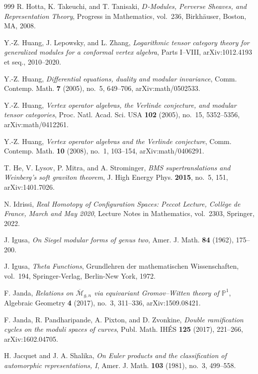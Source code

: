 \begin{thebibliography}{999}
R. Hotta, K. Takeuchi, and T. Tanisaki, \emph{$D$-Modules, Perverse Sheaves, and Representation Theory}, Progress in Mathematics, vol.~236, Birkh\"auser, Boston, MA, 2008.

Y.-Z. Huang, J. Lepowsky, and L. Zhang, \emph{Logarithmic tensor category theory for generalized modules for a conformal vertex algebra}, Parts I--VIII, arXiv:1012.4193 et seq., 2010--2020.

Y.-Z. Huang, \emph{Differential equations, duality and modular invariance}, Comm. Contemp. Math. \textbf{7} (2005), no.~5, 649--706, arXiv:math/0502533.

Y.-Z. Huang, \emph{Vertex operator algebras, the Verlinde conjecture, and modular tensor categories}, Proc. Natl. Acad. Sci. USA \textbf{102} (2005), no.~15, 5352--5356, arXiv:math/0412261.

Y.-Z. Huang, \emph{Vertex operator algebras and the Verlinde conjecture}, Comm. Contemp. Math. \textbf{10} (2008), no.~1, 103--154, arXiv:math/0406291.

T. He, V. Lysov, P. Mitra, and A. Strominger, \emph{BMS supertranslations and Weinberg's soft graviton theorem}, J. High Energy Phys. \textbf{2015}, no.~5, 151, arXiv:1401.7026.

N. Idrissi, \emph{Real Homotopy of Configuration Spaces: Peccot Lecture, Coll\`ege de France, March and May 2020}, Lecture Notes in Mathematics, vol.~2303, Springer, 2022.

J. Igusa, \emph{On Siegel modular forms of genus two}, Amer. J. Math. \textbf{84} (1962), 175--200.

J. Igusa, \emph{Theta Functions}, Grundlehren der mathematischen Wissenschaften, vol.~194, Springer-Verlag, Berlin-New York, 1972.

F. Janda, \emph{Relations on $\overline{\mathcal{M}}_{g,n}$ via equivariant Gromov--Witten theory of $\mathbb{P}^1$}, Algebraic Geometry \textbf{4} (2017), no.~3, 311--336, arXiv:1509.08421.

F. Janda, R. Pandharipande, A. Pixton, and D. Zvonkine, \emph{Double ramification cycles on the moduli spaces of curves}, Publ. Math. IH\'ES \textbf{125} (2017), 221--266, arXiv:1602.04705.

H. Jacquet and J. A. Shalika, \emph{On Euler products and the classification of automorphic representations, I}, Amer. J. Math. \textbf{103} (1981), no.~3, 499--558.


\end{thebibliography}
